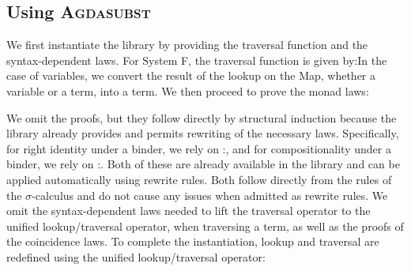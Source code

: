 \documentclass[screen,nonacm]{acmart}
\begin{document}
\subsection*{Using \textsc{Agdasubst}}
We first instantiate the library by providing the traversal function and the
syntax-dependent laws. For System F, the traversal function is given
by:\SFTraversal{}In the case of variables, we convert the result of the lookup
on the Map, whether a variable or a term, into a term. We then proceed to prove
the monad laws:

\noindent\begin{minipage}[t]{0.48\linewidth}
      \small
      \raggedright{}
      \SFId{}
\end{minipage}
\begin{minipage}[t]{0.48\linewidth}
      \small
      \raggedright{}
      \SFCompo{}
\end{minipage}

\noindent We omit the proofs, but they follow directly by structural induction because
the library already provides and permits rewriting of the necessary laws.
Specifically, for right identity under a binder, we rely on
\;:\;\AIdLift{}, and for compositionality under a binder, we
rely on \;:\;\ADistLift{}. Both of these are already
available in the library and can be applied automatically using rewrite rules.
Both follow directly from the rules of the $σ$-calculus and do not cause any issues when admitted as rewrite rules.
We omit the syntax-dependent laws needed to lift the traversal operator to the unified lookup/traversal operator, when traversing a term, as well as the proofs of the coincidence laws. To complete the instantiation, lookup and traversal are redefined using the unified lookup/traversal operator:

\noindent \begin{minipage}[t]{0.48\linewidth}
      \small
      \raggedright{}
      \SFLookupSH{}
\end{minipage}
\begin{minipage}[t]{0.48\linewidth}
      \small
      \raggedright{}
      \SFTraversalSH{}
\end{minipage}
\end{document}
